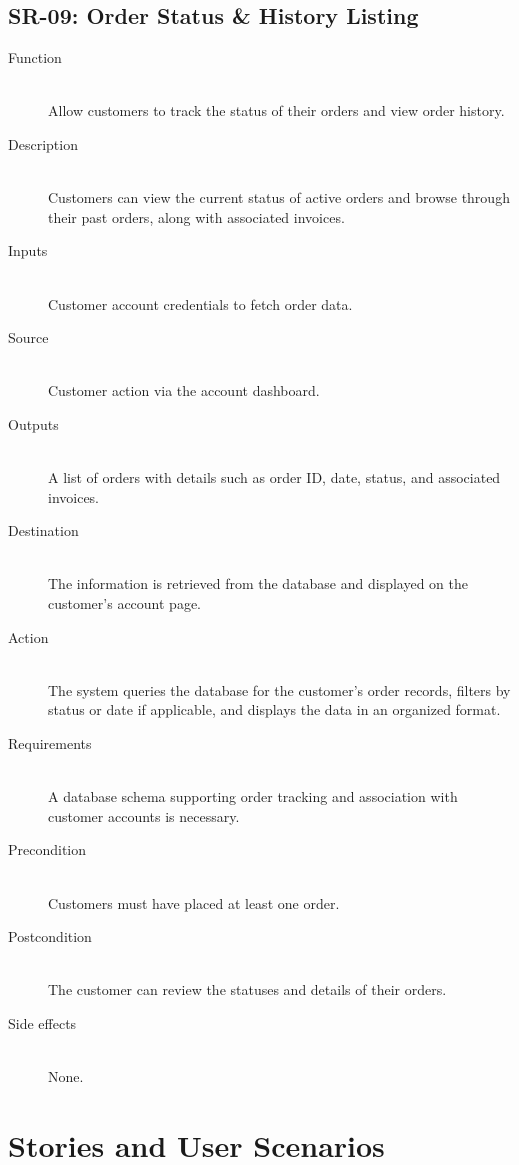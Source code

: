 \documentclass[a4paper,journal]{IEEEtran}
\begin{document}
\subsection{SR-09: Order Status \& History Listing}
\begin{description}
  \item[Function] \hfill \\
  Allow customers to
  track the status of their orders and view order history.
  \item[Description] \hfill \\
  Customers can view the current status of active orders
  and browse through their past orders, along with associated invoices.
  \item[Inputs] \hfill \\
  Customer account credentials to fetch order data.
  \item[Source] \hfill \\
  Customer action via the account dashboard.
  \item[Outputs] \hfill \\
  A list of orders with details such as order ID, date,
  status, and associated invoices.
  \item[Destination] \hfill \\
  The information is retrieved from the database and
  displayed on the customer's account page.
  \item[Action] \hfill \\
  The system queries the database for the customer's
  order records, filters by status or date if applicable, and displays the data
  in an organized format.
  \item[Requirements] \hfill \\
  A database schema supporting order tracking and
  association with customer accounts is necessary.
  \item[Precondition] \hfill \\
  Customers must have placed at least one order.
  \item[Postcondition] \hfill \\
  The customer can review the statuses and details of
  their orders.
  \item[Side effects] \hfill \\
  None.
\end{description}

\section{Stories and User Scenarios}
\end{document}
